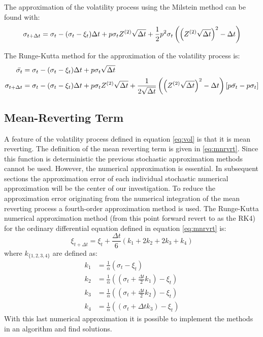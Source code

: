 \documentclass[a4paper,onecolumn,draft]{IEEEtran}
\begin{document}
The approximation of the volatility process using the Milstein method can be
found with:
\begin{equation}
\sigma_{t + \Delta t} = \sigma_t - (\sigma_t - \xi_t)\Delta t +
	p\sigma_t Z^{(2)} \sqrt{\Delta t} + \frac{1}{2}p^2\sigma_t 
	\left(\left(Z^{(2)}\sqrt{\Delta t}\right)^2 - \Delta t\right)
\end{equation}

The Runge-Kutta method for the approximation of the volatility process is:
\begin{equation}
\begin{split}
\bar{\sigma_t} &= \sigma_t  -(\sigma_t - \xi_t)\Delta t + p\sigma_t 
	\sqrt{\Delta t}\\
\sigma_{t + \Delta t} &= \sigma_t - (\sigma_t - \xi_t)\Delta t 
	+ p\sigma_t Z^{(2)}\sqrt{\Delta t}
	+ \frac{1}{2\sqrt{\Delta t}}\left(\left(Z^{(2)}\sqrt{\Delta t}\right)^2 -
\Delta t\right)[p\bar{\sigma_t} - p\sigma_t]
\end{split}
\end{equation}

\subsection{Mean-Reverting Term}
A feature of the volatility process defined in equation \eqref{eq:vol} is that
it is mean reverting. The definition of the mean reverting term is given in
\eqref{eq:mnrvrt}. Since this function is deterministic the previous
stochastic approximation methods cannot be used. However, the numerical
approximation is essential. In subsequent sections the approximation error of
each individual stochastic numerical approximation will be the center of our
investigation. To reduce the approximation error originating from the
numerical integration of the mean reverting process a fourth-order
approximation method is used.  The Runge-Kutta numerical approximation method
(from this point forward revert to as the RK4) for the ordinary differential
equation defined in equation \eqref{eq:mnrvrt} is:
\begin{equation}
\xi_{t + \Delta t} = \xi_t + \frac{\Delta t}{6}(k_1 + 2k_2 + 2k_3 + k_4)
\end{equation}
where $k_{\{1, 2, 3, 4\}}$ are defined as:
\begin{align*}
k_1 &= \frac{1}{\alpha}(\sigma_t - \xi_t)\\
k_2 &= \frac{1}{\alpha}\left(\left(\sigma_t + \frac{\Delta t}{2}k_1\right) -
	\xi_t\right)\\
k_3 &= \frac{1}{\alpha}\left(\left(\sigma_t + \frac{\Delta t}{2}k_2\right) -
	\xi_t\right)\\
k_4 &= \frac{1}{\alpha}\left(\left(\sigma_t + \Delta t k_3\right) -
	\xi_t\right)
\end{align*}
With this last numerical approximation it is possible to implement the methods
in an algorithm and find solutions.
\end{document}
